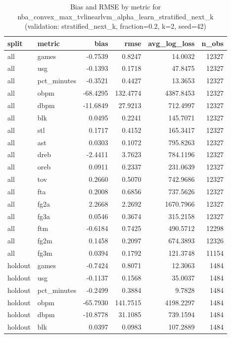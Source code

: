 \begin{table}
\caption{Bias and RMSE by metric for nba_convex_max_tvlinearlvm_alpha_learn_stratified_next_k (validation: stratified_next_k, fraction=0.2, k=2, seed=42)}
\label{tab:nba_convex_max_tvlinearlvm_alpha_learn_stratified_next_k_vs_stratified_next_k_f20_k2_s42_bias_rmse}
\begin{tabular}{llrrrr}
\toprule
split & metric & bias & rmse & avg\_log\_loss & n\_obs \\
\midrule
all & games & -0.7539 & 0.8247 & 14.0032 & 12327 \\
all & usg & -0.1393 & 0.1718 & 47.8475 & 12327 \\
all & pct\_minutes & -0.3521 & 0.4427 & 13.3653 & 12327 \\
all & obpm & -68.4295 & 132.4774 & 4387.8453 & 12327 \\
all & dbpm & -11.6849 & 27.9213 & 712.4997 & 12327 \\
all & blk & 0.0495 & 0.2241 & 145.7071 & 12327 \\
all & stl & 0.1717 & 0.4152 & 165.3417 & 12327 \\
all & ast & 0.0303 & 0.1072 & 795.8263 & 12327 \\
all & dreb & -2.4411 & 3.7623 & 784.1196 & 12327 \\
all & oreb & 0.0911 & 0.2337 & 231.0639 & 12327 \\
all & tov & 0.2660 & 0.5070 & 742.9686 & 12327 \\
all & fta & 0.2008 & 0.6856 & 737.5626 & 12327 \\
all & fg2a & 2.2668 & 2.2692 & 1670.7966 & 12327 \\
all & fg3a & 0.0546 & 0.3674 & 315.2158 & 12327 \\
all & ftm & -0.6184 & 0.7425 & 490.5712 & 12298 \\
all & fg2m & 0.1458 & 0.2097 & 674.3893 & 12326 \\
all & fg3m & 0.0394 & 0.1792 & 121.3748 & 11154 \\
holdout & games & -0.7424 & 0.8071 & 12.3063 & 1484 \\
holdout & usg & -0.1137 & 0.1568 & 35.0037 & 1484 \\
holdout & pct\_minutes & -0.2499 & 0.3884 & 9.7828 & 1484 \\
holdout & obpm & -65.7930 & 141.7515 & 4198.2297 & 1484 \\
holdout & dbpm & -10.8778 & 31.1085 & 739.1594 & 1484 \\
holdout & blk & 0.0397 & 0.0983 & 107.2889 & 1484 \\

\end{tabular}
\end{table}
